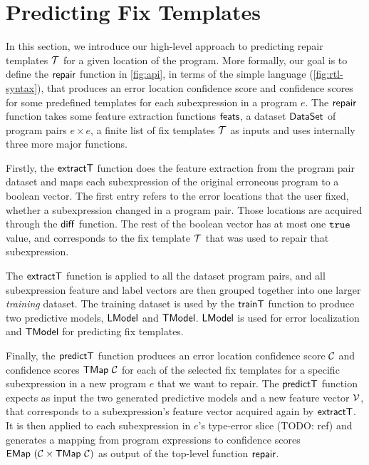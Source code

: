\section{Predicting Fix Templates}
\label{sec:templ-pred}

In this section, we introduce our high-level approach to predicting repair
templates $\mathcal{T}$ for a given location of the program. More formally, our goal is
to define the $\mathsf{repair}$ function in \autoref{fig:api}, in terms of the simple
language \repairLang (\autoref{fig:rtl-syntax}), that produces an error location
confidence score and confidence scores for some predefined templates for each
subexpression in a program $e$. The $\mathsf{repair}$ function takes some feature
extraction functions $\mathsf{feats}$, a dataset $\mathsf{DataSet}$ of program pairs $e
\times e$, a finite list of fix templates $\mathcal{T}$ as inputs and uses internally
three more major functions.

Firstly, the $\mathsf{extractT}$ function does the feature extraction from the
program pair dataset and maps each subexpression of the original erroneous
program to a boolean vector. The first entry refers to the error locations that
the user fixed, \ie whether a subexpression changed in a program pair. Those
locations are acquired through the $\mathsf{diff}$ function. The rest of the boolean
vector has at most one $\mathtt{true}$ value, and corresponds to the fix template $\mathcal{T}$
that was used to repair that subexpression.

The $\mathsf{extractT}$ function is applied to all the dataset program pairs, and all
subexpression feature and label vectors are then grouped together into one
larger \emph{training} dataset. The training dataset is used by the $\mathsf{trainT}$
function to produce two predictive models, $\mathsf{LModel}$ and $\mathsf{TModel}$. $\mathsf{LModel}$ is
used for error localization and $\mathsf{TModel}$ for predicting fix templates.

Finally, the $\mathsf{predictT}$ function produces an error location confidence score
$\mathcal{C}$ and confidence scores $\mathsf{TMap}\ \mathcal{C}$ for each of the selected fix
templates for a specific subexpression in a new program $e$ that we want to
repair. The $\mathsf{predictT}$ function expects as input the two generated
predictive models and a new feature vector $\mathcal{V}$, that corresponds to a
subexpression's feature vector acquired again by $\mathsf{extractT}$. It is then
applied to each subexpression in $e$'s type-error slice (TODO: ref) and
generates a mapping from program expressions to confidence scores $\mathsf{EMap}\ (\mathcal{C}
\times \mathsf{TMap}\ \mathcal{C})$ as output of the top-level function $\mathsf{repair}$.


